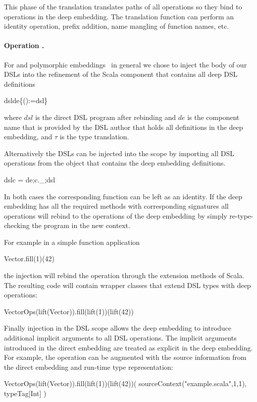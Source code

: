 This phase of the translation translates paths of all operations so they bind
 to operations in the deep embedding. The translation function can perform an
 identity operation, prefix addition, name mangling of function names, etc.


\paragraph{Operation .} For \yy and polymorphic embeddings~\cite{hofer_polymorphic_2008}
in general we chose to inject the body of our DSLs into the refinement of the Scala component that
contains all deep DSL definitions

  \infyyax{}
   {dsl}{\;\;de\;\;\{\;\;\;\;():\;\;\ttother[T]\;=\;dsl\;\}}

where $dsl$ is the direct DSL program after rebinding and $de$ is the component name
that is provided by the DSL author that holds all definitions in the deep embedding, and
$\tau$ is the type translation.

Alternatively the DSLs can be injected into the scope by importing all DSL operations
 from the object that contains the deep embedding definitions.

  \infyyax{}
    {dsl}{\;\;c \; = \; \;\;de;\;\;\;\;\;c.\_;\;\;\;dsl}

In both cases the corresponding  function can be left as an
identity. If the deep embedding has all the required methods with corresponding
 signatures all operations will rebind to the
operations of the deep embedding by simply re-type-checking the program in the new context.

For example in a simple function application\begin{lstparagraph}
Vector.fill(1)(42)
\end{lstparagraph}the injection will rebind the operation through the extension methods of Scala. The
resulting code will contain wrapper classes that extend DSL types with deep operations:\begin{lstparagraph}
VectorOps(lift(Vector)).fill(lift(1))(lift(42))
\end{lstparagraph}

Finally injection in the DSL scope allows the deep embedding to introduce additional implicit arguments to
 all DSL operations. The implicit arguments introduced in the direct embedding are treated
 as explicit in the deep embedding. For example, the  operation can be augmented
 with the source information from the direct embedding and run-time type representation:\begin{lstparagraph}
VectorOps(lift(Vector)).fill(lift(1))(lift(42))(
  sourceContext("example.scala",1,1), typeTag[Int]
)
\end{lstparagraph}

